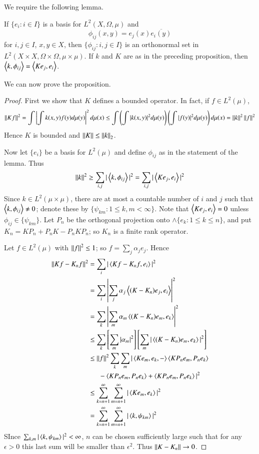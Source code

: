 We require the following lemma.

\begin{lem}
    If $\{e_i:i \in I\}$ is a basis for $L^2(X,\Omega,\mu)$ and $$\phi_{ij}(x,y) = e_j(x)\overline{e_i(y)}$$
    for $i,j \in I$, $x,y \in X$, then $\{\phi_{ij}:i,j \in I\}$ is an orthonormal set in $L^2(X\times X,\Omega \times \Omega,\mu\times \mu)$. If $k$ and $K$ are as in the preceding proposition, then $\left\langle k, \phi_{ij}\right\rangle = \left\langle Ke_j, e_i\right\rangle$.
\end{lem}

We can now prove the proposition.
    
\begin{proof}
    First we show that $K$ defines a bounded operator. In fact, if $f \in L^2(\mu)$, $$\left|\left| Kf\right|\right|^2 = \int\left|\int k(x,y)f(y)d\mu(y)\right|^2d\mu(x) \leq \int\left(\int |k(x,y)|^2d\mu(y)\right)\left(\int|f(y)|^2d\mu(y)\right)d\mu(x) = \left|\left| k\right|\right|^2\left|\left| f\right|\right|^2$$
    Hence $K$ is bounded and $\left|\left| K\right|\right| \leq \left|\left| k\right|\right|_2$.

    Now let $\{e_i\}$ be a basis for $L^2(\mu)$ and define $\phi_{ij}$ as in the statement of the lemma. Thus $$\left|\left| k\right|\right|^2 \geq \sum_{i,j}|\left\langle k, \phi_{ij}\right\rangle|^2 = \sum_{i,j}|\left\langle Ke_j, e_i\right\rangle|^2$$
    Since $k \in L^2(\mu\times \mu)$, there are at most a countable number of $i$ and $j$ such that $\left\langle k, \phi_{ij}\right\rangle \neq 0$; denote these by $\{\psi_{km}:1\leq k,m < \infty\}$. Note that $\left\langle Ke_j, e_i\right\rangle = 0$ unless $\phi_{ij} \in \{\psi_{km}\}$. Let $P_n$ be the orthogonal projection onto $\land\{e_k:1\leq k \leq n\}$, and put $K_n = KP_n + P_nK - P_nKP_n$; so $K_n$ is a finite rank operator.

    Let $f \in L^2(\mu)$ with $\left|\left| f\right|\right|^2 \leq 1$; so $f = \sum_j\alpha_je_j$. Hence \begin{align*}
        \left|\left| Kf-K_nf\right|\right|^2 &= \sum_i|\left\langle Kf-K_nf, e_i\right\rangle|^2 \\
        &= \sum_i\left|\sum_j\alpha_j\left\langle (K-K_n)e_j, e_i\right\rangle\right|^2 \\
        &= \sum_k\left|\sum_m\alpha_m\left\langle (K-K_n)e_m, e_k\right\rangle\right|^2 \\
        &\leq \sum_k\left[\sum_m|\alpha_m|^2\right]\left[\sum_m|\left\langle (K-K_n)e_m, e_k\right\rangle|^2\right] \\
        &\leq \left|\left| f\right|\right|^2 \sum_k\sum_m|\left\langle Ke_m,e_k, -\right\rangle\left\langle KP_ne_m, P_ne_k\right\rangle \\
        &\hspace{15pt}-\left\langle KP_ne_m, P_ne_k\right\rangle + \left\langle KP_ne_m, P_ne_k\right\rangle|^2 \\
        &\leq \sum_{k=n+1}^{\infty}\sum_{m=n+1}^{\infty}|\left\langle Ke_m, e_k\right\rangle|^2 \\
        &= \sum_{k=n+1}^{\infty}\sum_{m=n+1}^{\infty}|\left\langle k, \psi_{km}\right\rangle|^2
    \end{align*}
    SInce $\sum_{k,m}|\left\langle k, \psi_{km}\right\rangle|^2 < \infty$, $n$ can be chosen sufficiently large such that for any $\epsilon > 0$ this last sum will be smaller than $\epsilon^2$. Thus $\left|\left| K-K_n\right|\right|\rightarrow 0$.
\end{proof}


